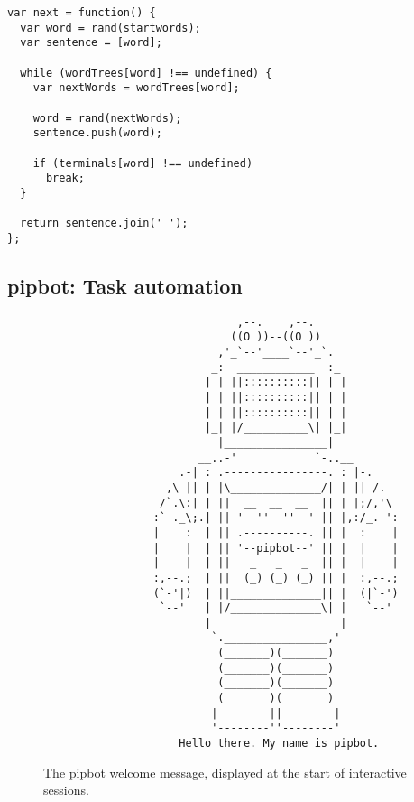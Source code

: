 \lstset{language=JavaScript}
\begin{lstlisting}[label=lst:markov-text-generator,caption={%
      [Markov text generator]
      Markov text generator implementation.}]
var next = function() {
  var word = rand(startwords);
  var sentence = [word];

  while (wordTrees[word] !== undefined) {
    var nextWords = wordTrees[word];

    word = rand(nextWords);
    sentence.push(word);

    if (terminals[word] !== undefined)
      break;
  }

  return sentence.join(' ');
};
\end{lstlisting}


\newpage
\subsection{pipbot: Task automation}\label{sec:pipbot}


\begin{figure}[H]
\begin{verbatim}
                              ,--.    ,--.
                             ((O ))--((O ))
                           ,'_`--'____`--'_`.
                          _:  ____________  :_
                         | | ||::::::::::|| | |
                         | | ||::::::::::|| | |
                         | | ||::::::::::|| | |
                         |_| |/__________\| |_|
                           |________________|
                        __..-'            `-..__
                     .-| : .----------------. : |-.
                   ,\ || | |\______________/| | || /.
                  /`.\:| | ||  __  __  __  || | |;/,'\
                 :`-._\;.| || '--''--''--' || |,:/_.-':
                 |    :  | || .----------. || |  :    |
                 |    |  | || '--pipbot--' || |  |    |
                 |    |  | ||   _   _   _  || |  |    |
                 :,--.;  | ||  (_) (_) (_) || |  :,--.;
                 (`-'|)  | ||______________|| |  (|`-')
                  `--'   | |/______________\| |   `--'
                         |____________________|
                          `.________________,'
                           (_______)(_______)
                           (_______)(_______)
                           (_______)(_______)
                           (_______)(_______)
                          |        ||        |
                          '--------''--------'
                     Hello there. My name is pipbot.
\end{verbatim}
\caption[The pipbot welcome message]
  {The pipbot welcome message, displayed at the start of interactive sessions.}
\label{fig:pipbot-logo}
\end{figure}


